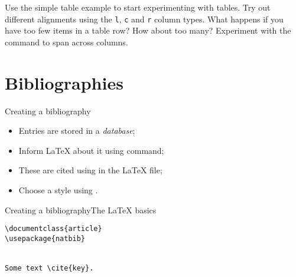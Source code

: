 \begin{exercise}

  Use the simple table example to start experimenting with tables.
  Try out different alignments using the \texttt{l}, \texttt{c} and
  \texttt{r} column types. What happens if you have too few items
  in a table row? How about too many? Experiment with the
   command to span across columns.
  
\end{exercise}


\section{Bibliographies}

\begin{frame}{Creating a bibliography}

  \begin{itemize}
    \item Entries are stored in a \emph{\BibTeX{} database};
    \item Inform \LaTeX{} about it using  command;
    \item These are cited using  in the \LaTeX{} file;
    \item Choose a style using .
  \end{itemize}
  
\end{frame}

\begin{frame}[fragile]{Creating a bibliography}{The \LaTeX{} basics}

\begin{verbatim}
\documentclass{article}
\usepackage{natbib}


Some text \cite{key}.


\end{verbatim}
  
\end{frame}


